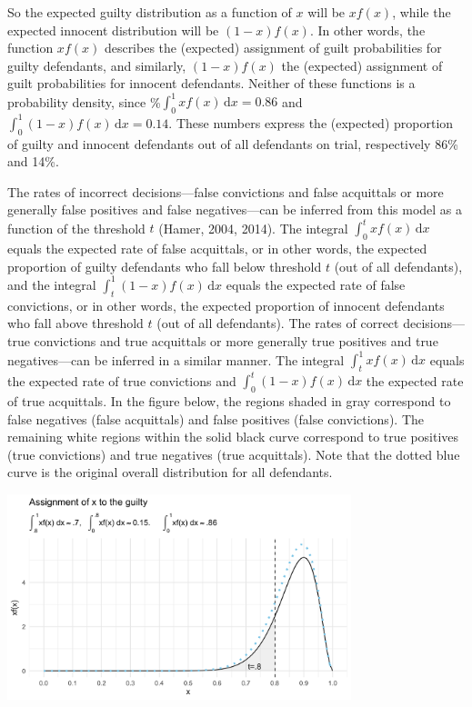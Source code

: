\documentclass[10pt,dvipsnames,enabledeprecatedfontcommands]{scrartcl}
\begin{document}
So the expected guilty distribution as a function of \(x\) will be
\(x f(x)\), while the expected innocent distribution will be
\((1-x)f(x)\). In other words, the function \(xf(x)\) describes the
(expected) assignment of guilt probabilities for guilty defendants, and
similarly, \((1-x)f(x)\) the (expected) assignment of guilt
probabilities for innocent defendants. Neither of these functions is a
probability density, since \%\(\int_0^1 \! xf(x) \, \mathrm{d}x=0.86\)
and \(\int_0^1 \! (1-x)f(x) \, \mathrm{d}x=0.14\). These numbers express
the (expected) proportion of guilty and innocent defendants out of all
defendants on trial, respectively 86\% and 14\%.

The rates of incorrect decisions---false convictions and false
acquittals or more generally false positives and false negatives---can
be inferred from this model as a function of the threshold \(t\) (Hamer,
2004, 2014). The integral \(\int_0^t \! xf(x) \, \mathrm{d}x\) equals
the expected rate of false acquittals, or in other words, the expected
proportion of guilty defendants who fall below threshold \(t\) (out of
all defendants), and the integral
\(\int_t^1 \! (1-x)f(x) \, \mathrm{d}x\) equals the expected rate of
false convictions, or in other words, the expected proportion of
innocent defendants who fall above threshold \(t\) (out of all
defendants). The rates of correct decisions---true convictions and true
acquittals or more generally true positives and true negatives---can be
inferred in a similar manner. The integral
\(\int_t^1 \! xf(x) \, \mathrm{d}x\) equals the expected rate of true
convictions and \(\int_0^t \! (1-x)f(x) \, \mathrm{d}x\) the expected
rate of true acquittals. In the figure below, the regions shaded in gray
correspond to false negatives (false acquittals) and false positives
(false convictions). The remaining white regions within the solid black
curve correspond to true positives (true convictions) and true negatives
(true acquittals). Note that the dotted blue curve is the original
overall distribution for all defendants.

\begin{center}
    \includegraphics[width=10cm]{xfx3.png}
\end{center}
\end{document}

